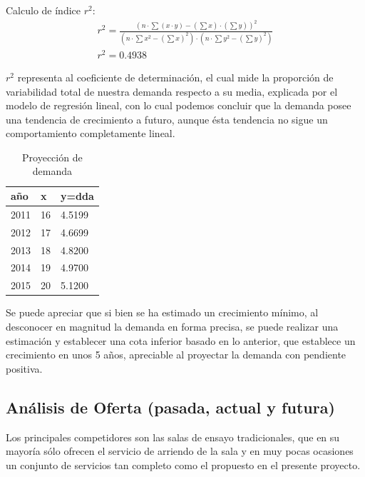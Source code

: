 
Calculo de índice $r^2$:\\

\begin{eqnarray}
r^2 = \frac{\left ( n \cdot \sum (x \cdot y) - (\sum x) \cdot (\sum y)\right )^2}{ \left (n \cdot \sum x^2 - (\sum x)^2 \right ) \cdot \left ( n \cdot \sum y^2 - (\sum y)^2 \right )}\\
r^2 = 0.4938 \nonumber
\end{eqnarray}

$r^2$ representa al coeficiente de determinación, el cual mide la proporción de
variabilidad total de nuestra demanda respecto a su media,
explicada por el modelo de regresión lineal, con lo cual podemos concluir que
la demanda posee una tendencia de crecimiento a futuro, aunque ésta tendencia
no sigue un comportamiento completamente lineal.

\begin{table}[h!]
\centering
\begin{tabular}{|l|l|l|}
	\hline
	año & x & y=dda\\
	\hline
	2011 & 16 & 4.5199\\
	\hline
	2012 & 17 & 4.6699\\
	\hline
	2013 & 18 & 4.8200\\
	\hline
	2014 & 19 & 4.9700\\
	\hline
	2015 & 20 & 5.1200\\
	\hline
\end{tabular}
\caption{Proyección de demanda}
\end{table}

Se puede apreciar que si bien se ha estimado un crecimiento mínimo, al desconocer en magnitud la demanda en forma precisa, se puede realizar una estimación
y establecer una cota inferior basado en lo anterior, que establece un crecimiento en unos 5 años, apreciable al proyectar la demanda con pendiente positiva.

\subsection{Análisis de Oferta (pasada, actual y futura)}
	Los principales competidores son las salas de ensayo tradicionales, que en su mayoría sólo ofrecen el servicio de arriendo de la sala y en muy pocas ocasiones un conjunto de servicios tan completo como el propuesto en el presente proyecto.

